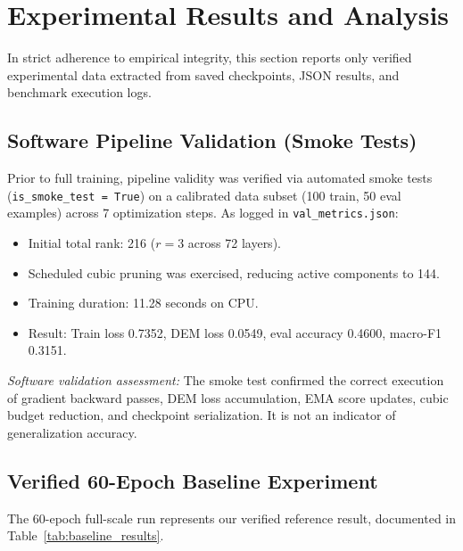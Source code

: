 \documentclass[conference]{IEEEtran}
\begin{document}
\section{Experimental Results and Analysis}
\label{sec:results}

In strict adherence to empirical integrity, this section reports only verified experimental data extracted from saved checkpoints, JSON results, and benchmark execution logs.

\subsection{Software Pipeline Validation (Smoke Tests)}
Prior to full training, pipeline validity was verified via automated smoke tests (\texttt{is\_smoke\_test = True}) on a calibrated data subset (100 train, 50 eval examples) across 7 optimization steps. As logged in \texttt{val\_metrics.json}:
\begin{itemize}
  \item Initial total rank: 216 ($r=3$ across 72 layers).
  \item Scheduled cubic pruning was exercised, reducing active components to 144.
  \item Training duration: 11.28 seconds on CPU.
  \item Result: Train loss 0.7352, DEM loss 0.0549, eval accuracy 0.4600, macro-F1 0.3151.
\end{itemize}
\textit{Software validation assessment:} The smoke test confirmed the correct execution of gradient backward passes, DEM loss accumulation, EMA score updates, cubic budget reduction, and checkpoint serialization. It is not an indicator of generalization accuracy.

\subsection{Verified 60-Epoch Baseline Experiment}
The 60-epoch full-scale run represents our verified reference result, documented in Table~\ref{tab:baseline_results}.
\end{document}
